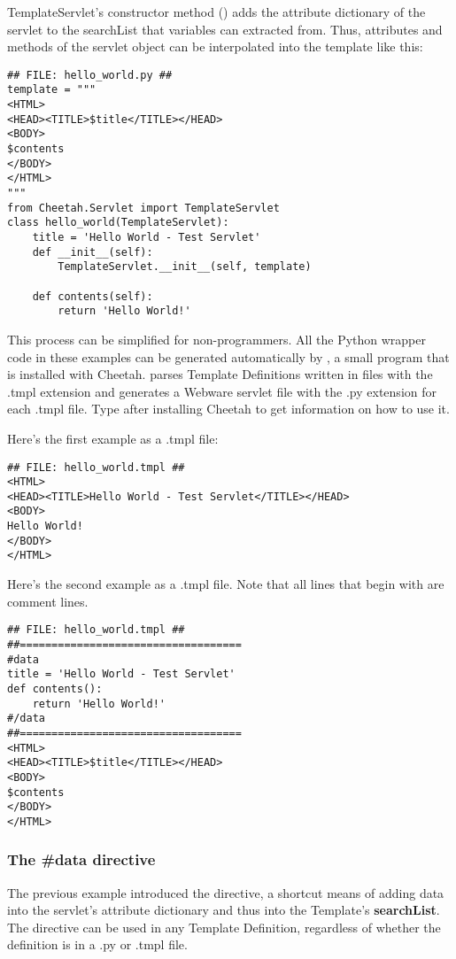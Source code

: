TemplateServlet's constructor method () adds
the attribute dictionary of the servlet to the searchList that
 variables can extracted from.  Thus, attributes and methods
of the servlet object can be interpolated into the template like this:

\begin{verbatim}
## FILE: hello_world.py ##
template = """
<HTML>
<HEAD><TITLE>$title</TITLE></HEAD>
<BODY>
$contents
</BODY>
</HTML>
"""
from Cheetah.Servlet import TemplateServlet
class hello_world(TemplateServlet):
    title = 'Hello World - Test Servlet'
    def __init__(self):
        TemplateServlet.__init__(self, template) 

    def contents(self):
        return 'Hello World!'
\end{verbatim}

This process can be simplified for non-programmers. All the Python wrapper code
in these examples can be generated automatically by , a small program
that is installed with Cheetah.  parses Template Definitions
written in files with the .tmpl extension and generates a Webware servlet file
with the .py extension for each .tmpl file.  Type  after
installing Cheetah to get information on how to use it.

Here's the first example as a .tmpl file:

\begin{verbatim}
## FILE: hello_world.tmpl ##
<HTML>
<HEAD><TITLE>Hello World - Test Servlet</TITLE></HEAD>
<BODY>
Hello World!
</BODY>
</HTML>
\end{verbatim}

Here's the second example as a .tmpl file.  Note that all lines that begin with
\code{\#\#} are comment lines.

\begin{verbatim}
## FILE: hello_world.tmpl ##
##===================================
#data
title = 'Hello World - Test Servlet'
def contents():
    return 'Hello World!'
#/data
##===================================
<HTML>
<HEAD><TITLE>$title</TITLE></HEAD>
<BODY>
$contents
</BODY>
</HTML>
\end{verbatim}

\subsubsection{The \#data directive}
The previous example introduced the  directive, a shortcut means
of adding data into the servlet's attribute dictionary and thus into
the Template's {\bf searchList}. The  directive can be used in
any Template Definition, regardless of whether the definition is in a .py or
.tmpl file.  

